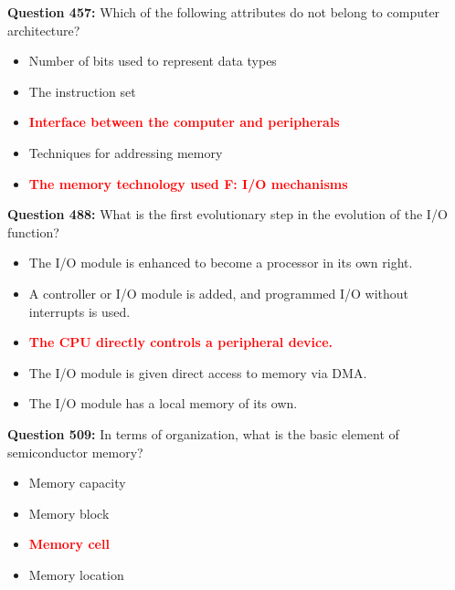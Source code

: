 \documentclass[12pt,a4paper]{article}
\begin{document}
\vspace{0.5cm}

\textbf{Question 457:} Which of the following attributes do not belong to computer architecture?

\begin{itemize}
    \item[\textbf{A.}] Number of bits used to represent data types
    \item[\textbf{B.}] The instruction set
    \item[\textbf{C.}] \textcolor{red}{\textbf{Interface between the computer and peripherals}}
    \item[\textbf{D.}] Techniques for addressing memory
    \item[\textbf{E.}] \textcolor{red}{\textbf{The memory technology used
F: I/O mechanisms}}
\end{itemize}

\vspace{0.5cm}

\textbf{Question 488:} What is the first evolutionary step in the evolution of the I/O function?

\begin{itemize}
    \item[\textbf{A.}] The I/O module is enhanced to become a processor in its own right.
    \item[\textbf{B.}] A controller or I/O module is added, and programmed I/O without interrupts is used.
    \item[\textbf{C.}] \textcolor{red}{\textbf{The CPU directly controls a peripheral device.}}
    \item[\textbf{D.}] The I/O module is given direct access to memory via DMA.
    \item[\textbf{E.}] The I/O module has a local memory of its own.
\end{itemize}

\vspace{0.5cm}

\textbf{Question 509:} In terms of organization, what is the basic element of semiconductor memory?

\begin{itemize}
    \item[\textbf{A.}] Memory capacity
    \item[\textbf{B.}] Memory block
    \item[\textbf{C.}] \textcolor{red}{\textbf{Memory cell}}
    \item[\textbf{D.}] Memory location
\end{itemize}
\end{document}
